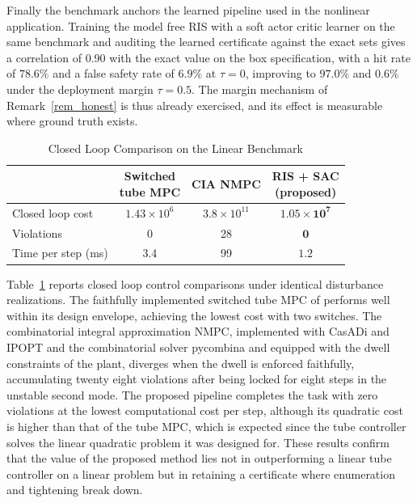 \documentclass[journal]{IEEEtran}
\begin{document}
Finally the benchmark anchors the learned pipeline used in the nonlinear application. Training the model free RIS with a soft actor critic learner \cite{haarnoja2018} on the same benchmark and auditing the learned certificate against the exact sets gives a correlation of $0.90$ with the exact value on the box specification, with a hit rate of $78.6\%$ and a false safety rate of $6.9\%$ at $\tau = 0$, improving to $97.0\%$ and $0.6\%$ under the deployment margin $\tau = 0.5$. The margin mechanism of Remark~\ref{rem_honest} is thus already exercised, and its effect is measurable where ground truth exists.

\begin{table}[!t]
\renewcommand{\arraystretch}{1.4}
\caption{Closed Loop Comparison on the Linear Benchmark}
\label{tab_linear_baseline}
\centering
\begin{tabular}{lccc}
\toprule
 & \makecell{Switched\\tube MPC \cite{zhang2016}} & \makecell{CIA NMPC\\\cite{chenlazar2022,sager2011}} & \makecell{\textbf{RIS + SAC}\\\textbf{(proposed)}} \\
\midrule
Closed loop cost & $1.43\times10^{6}$ & $3.8\times10^{11}$ & $\bm{1.05\times10^{7}}$ \\
Violations & 0 & 28 & $\bm{0}$ \\
Time per step (ms) & 3.4 & 99 & $\bm{1.2}$ \\
\bottomrule
\end{tabular}
\end{table}

Table~\ref{tab_linear_baseline} reports closed loop control comparisons under identical disturbance realizations. The faithfully implemented switched tube MPC of \cite{zhang2016} performs well within its design envelope, achieving the lowest cost with two switches. The combinatorial integral approximation NMPC, implemented with CasADi and IPOPT \cite{andersson2019casadi,wachter2006} and the combinatorial solver pycombina \cite{buerger2020pycombina} and equipped with the dwell constraints of the plant, diverges when the dwell is enforced faithfully, accumulating twenty eight violations after being locked for eight steps in the unstable second mode. The proposed pipeline completes the task with zero violations at the lowest computational cost per step, although its quadratic cost is higher than that of the tube MPC, which is expected since the tube controller solves the linear quadratic problem it was designed for. These results confirm that the value of the proposed method lies not in outperforming a linear tube controller on a linear problem but in retaining a certificate where enumeration and tightening break down.
\end{document}
